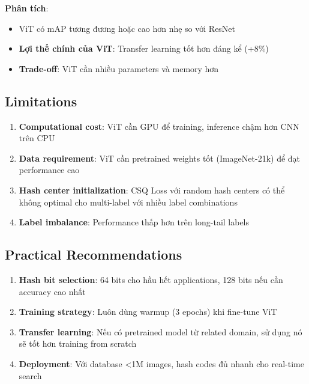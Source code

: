 \documentclass[12pt,a4paper]{article}
\begin{document}
\textbf{Phân tích}:
\begin{itemize}
    \item ViT có mAP tương đương hoặc cao hơn nhẹ so với ResNet
    \item \textbf{Lợi thế chính của ViT}: Transfer learning tốt hơn đáng kể (+8\%)
    \item \textbf{Trade-off}: ViT cần nhiều parameters và memory hơn
\end{itemize}

\subsection{Limitations}

\begin{enumerate}
    \item \textbf{Computational cost}: ViT cần GPU để training, inference chậm hơn CNN trên CPU
    
    \item \textbf{Data requirement}: ViT cần pretrained weights tốt (ImageNet-21k) để đạt performance cao
    
    \item \textbf{Hash center initialization}: CSQ Loss với random hash centers có thể không optimal cho multi-label với nhiều label combinations
    
    \item \textbf{Label imbalance}: Performance thấp hơn trên long-tail labels
\end{enumerate}

\subsection{Practical Recommendations}

\begin{enumerate}
    \item \textbf{Hash bit selection}: 64 bits cho hầu hết applications, 128 bits nếu cần accuracy cao nhất
    
    \item \textbf{Training strategy}: Luôn dùng warmup (3 epochs) khi fine-tune ViT
    
    \item \textbf{Transfer learning}: Nếu có pretrained model từ related domain, sử dụng nó sẽ tốt hơn training from scratch
    
    \item \textbf{Deployment}: Với database <1M images, hash codes đủ nhanh cho real-time search
\end{enumerate}
\end{document}
